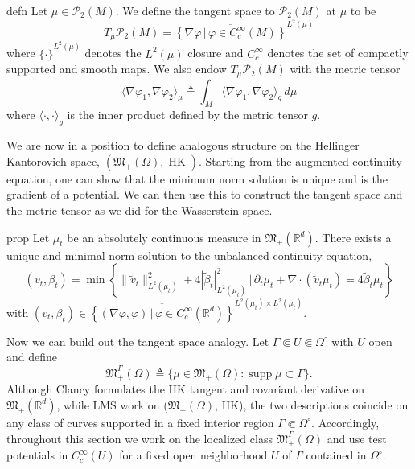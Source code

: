 \documentclass[11pt]{article}
\newcommand{\man}{M}
\newcommand{\HK}{\operatorname{HK}}
\begin{document}
\begin{restatable}{defn}{}
    Let $\mu \in \mathcal{P}_2(\man)$. We define the tangent space to $\mathcal{P}_2(\man)$ at $\mu$ to be 
    \begin{equation}
        T_\mu \mathcal{P}_2(\man) = \overline{\left\{\nabla \varphi \, | \, \varphi \in C_c^{\infty}(\man)\right\}}^{L^2(\mu)}
    \end{equation}
    where $\overline{\{\cdot \}}^{L^2(\mu)}$ denotes the $L^2(\mu)$ closure and $C_c^{\infty}$ denotes the set of compactly supported and smooth maps. We also endow $T_\mu \mathcal{P}_2(\man)$ with the metric tensor
    \begin{equation}
        \langle \nabla \varphi_1, \nabla \varphi_2\rangle_{\mu} \triangleq \int_\man \langle\nabla\varphi_1, \nabla\varphi_2 \rangle_g \,d\mu 
    \end{equation}
    where $\langle \cdot, \cdot \rangle_g$ is the inner product defined by the metric tensor $g$.
\end{restatable}

We are now in a position to define analogous structure on the Hellinger Kantorovich space, $(\mathfrak{M}_+(\Omega), \HK)$. Starting from the augmented continuity equation, one can show that the minimum norm solution is unique and is the gradient of a potential. We can then use this to construct the tangent space and the metric tensor as we did for the Wasserstein space.
\begin{restatable}{prop}{}
    Let $\mu_t$ be an absolutely continuous measure in $\mathfrak{M}_+(\mathbb{R}^d).$ There exists a unique and minimal norm solution to the unbalanced continuity equation,
    \begin{equation*}
        (v_t, \beta_t) = \min\left\{\|\tilde v_t\|_{L^2(\mu_t)}^2 + 4|\tilde \beta_t|_{L^2(\mu_t)}^2  \, \Big| \, \partial_t\mu_t + \nabla \cdot (\tilde v_t \mu_t) = 4\tilde \beta_t \mu_t\right\}
    \end{equation*}
    with $(v_t, \beta_t) \in \overline{\left\{(\nabla \varphi, \varphi) \, | \, \varphi \in C^{\infty}_c(\mathbb{R}^d)\right\}}^{L^2(\mu_t) \times L^2(\mu_t)}$.
\end{restatable}

Now we can build out the tangent space analogy. Let $\Gamma \Subset U \Subset \Omega^\circ$ with $U$ open and define 
 \[\mathfrak{M}_+^\Gamma(\Omega) \triangleq\{\mu \in \mathfrak{M}_+(\Omega) : \operatorname{supp} \mu \subset \Gamma\}.\]
Although Clancy formulates the HK tangent and covariant derivative on $\mathfrak{M}_+(\mathbb{R}^d)$, while LMS \citep{liero2016optimal} work on ($\mathfrak{M}_+(\Omega)$, HK), the two descriptions coincide on any class of curves supported in a fixed interior region $\Gamma \Subset \Omega^\circ$. Accordingly, throughout this section we work on the localized class $\mathfrak{M}_+^\Gamma(\Omega)$ and use test potentials in $C^\infty_c(U)$ for a fixed open neighborhood $U$ of $\Gamma$ contained in $\Omega^\circ$.
 
\end{document}
